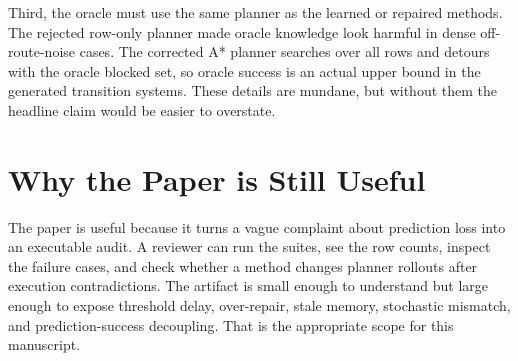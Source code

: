 \documentclass{article}
\begin{document}
Third, the oracle must use the same planner as the learned or repaired methods. The rejected row-only planner made oracle knowledge look harmful in dense off-route-noise cases. The corrected A* planner searches over all rows and detours with the oracle blocked set, so oracle success is an actual upper bound in the generated transition systems. These details are mundane, but without them the headline claim would be easier to overstate.

\section{Why the Paper is Still Useful}

The paper is useful because it turns a vague complaint about prediction loss into an executable audit. A reviewer can run the suites, see the row counts, inspect the failure cases, and check whether a method changes planner rollouts after execution contradictions. The artifact is small enough to understand but large enough to expose threshold delay, over-repair, stale memory, stochastic mismatch, and prediction-success decoupling. That is the appropriate scope for this manuscript.
\end{document}
